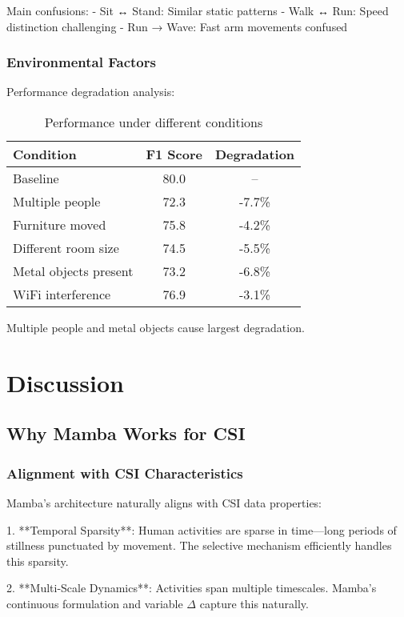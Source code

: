 \documentclass[10pt,journal,compsoc]{IEEEtran}
\begin{document}
Main confusions:
- Sit ↔ Stand: Similar static patterns
- Walk ↔ Run: Speed distinction challenging
- Run → Wave: Fast arm movements confused

\subsubsection{Environmental Factors}

Performance degradation analysis:

\begin{table}[h]
\centering
\caption{Performance under different conditions}
\label{tab:conditions}
\begin{tabular}{lcc}
\toprule
Condition & F1 Score & Degradation \\
\midrule
Baseline & 80.0 & -- \\
Multiple people & 72.3 & -7.7\% \\
Furniture moved & 75.8 & -4.2\% \\
Different room size & 74.5 & -5.5\% \\
Metal objects present & 73.2 & -6.8\% \\
WiFi interference & 76.9 & -3.1\% \\
\bottomrule
\end{tabular}
\end{table}

Multiple people and metal objects cause largest degradation.

\section{Discussion}
\label{sec:discussion}

\subsection{Why Mamba Works for CSI}

\subsubsection{Alignment with CSI Characteristics}

Mamba's architecture naturally aligns with CSI data properties:

1. **Temporal Sparsity**: Human activities are sparse in time—long periods of stillness punctuated by movement. The selective mechanism efficiently handles this sparsity.

2. **Multi-Scale Dynamics**: Activities span multiple timescales. Mamba's continuous formulation and variable $\Delta$ capture this naturally.
\end{document}

